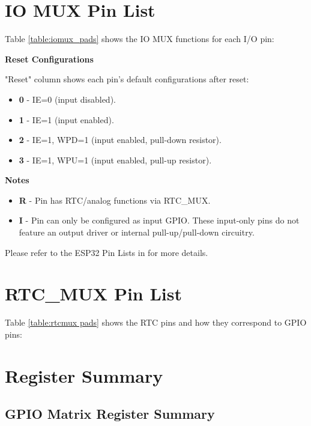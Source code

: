 \documentclass[main\_\_EN.tex]{subfiles}
\begin{document}
\section{IO MUX Pin List}
\label{sec:iomux_pads}
Table \ref{table:iomux_pads} shows the IO MUX functions for each I/O pin:



\textbf{Reset Configurations}

"Reset" column shows each pin's default configurations after reset:

\begin{itemize}
\item \textbf{0} - IE=0 (input disabled).
\item \textbf{1} - IE=1 (input enabled).
\item \textbf{2} - IE=1, WPD=1 (input enabled, pull-down resistor).
\item \textbf{3} - IE=1, WPU=1 (input enabled, pull-up resistor).
\end{itemize}

\textbf{Notes}

\begin{itemize}
\item \textbf{R} - Pin has RTC/analog functions via RTC\_MUX.
\item \textbf{I} - Pin can only be configured as input GPIO. These input-only pins do not feature an output driver or internal pull-up/pull-down circuitry.
\end{itemize}

Please refer to the ESP32 Pin Lists in \doclinkcdEN for more details.


\section{RTC\_MUX Pin List}
\label{sec:rtcmux_pins}

Table \ref{table:rtcmux pads} shows the RTC pins and how they correspond to GPIO pins:



\hypertarget{iomuxgpio-reg-summ}{}
\section{Register Summary}
\label{section:4.12}

\subsection{GPIO Matrix Register Summary}\label{sec:gpio-reg-summ}

\end{document}
